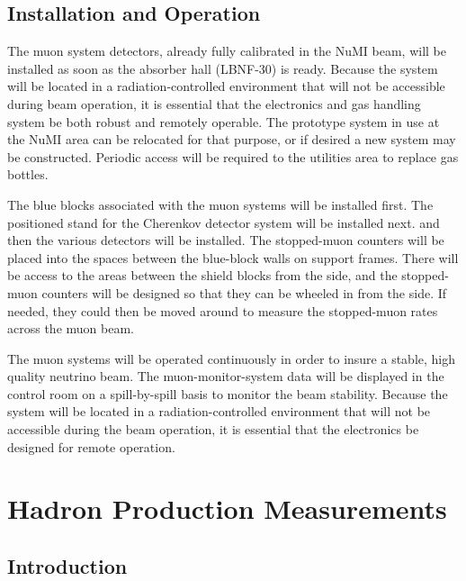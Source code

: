 %


\subsection{Installation and Operation}

The muon system detectors, already fully calibrated in the NuMI beam,
will be installed as soon as the absorber hall (LBNF-30) is ready.
Because the system will be located in a radiation-controlled
environment that will not be accessible during beam operation, it is
essential that the electronics and gas handling system be both robust
and remotely operable.  The prototype system in use at the NuMI area can be relocated for that purpose,
or if desired a new system may be constructed.
Periodic access will be required to the utilities area to replace gas bottles.

The blue blocks associated with the muon systems will be installed first.
The positioned stand for the Cherenkov detector system will be installed next.
and then the various detectors will be installed.
The stopped-muon counters will be placed into the spaces between the blue-block walls on
support frames.   There will be access to the areas between the shield blocks 
from the side, and the stopped-muon counters will be designed so that they can 
be wheeled in from the side.  If needed, they could then be moved around to measure
the stopped-muon rates across the muon beam.

The muon systems will be operated continuously in order to insure a stable,
high quality neutrino beam.
The muon-monitor-system data will be displayed in the control room on
a spill-by-spill basis to monitor the beam stability. Because the
system will be located in a radiation-controlled environment that will
not be accessible during the beam operation, it is essential that the
electronics be designed for remote operation.

\section{Hadron Production Measurements}
\label{sec:detectors-nd-ref-hadron}

\subsection{Introduction}

